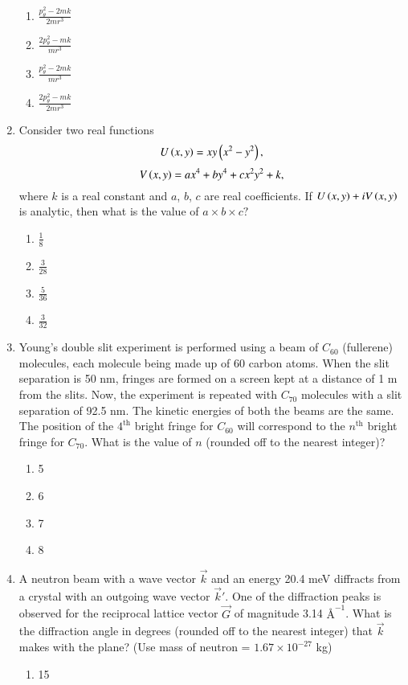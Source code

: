 \documentclass[journal]{IEEEtran}
\begin{document}
\begin{enumerate}
\begin{enumerate}
\item $\frac{p_{\theta}^2 - 2mk}{2mr^3}$
\item $\frac{2p_{\theta}^2 - mk}{mr^3}$
\item $\frac{p_{\theta}^2 - 2mk}{mr^3}$
\item $\frac{2p_{\theta}^2 - mk}{2mr^3}$
\end{enumerate}
\item Consider two real functions 
\[
U\left(x, y\right) = x y \left(x^2 - y^2\right),
\]
\[
V\left(x, y\right) = a x^4 + b y^4 + c x^2 y^2 + k,
\]
where $k$ is a real constant and $a$, $b$, $c$ are real coefficients. If $U\left(x, y\right) + i V\left(x, y\right)$ is analytic, then what is the value of $a \times b \times c?$
\begin{enumerate}
\item $\frac{1}{8}$
\item $\frac{3}{28}$
\item $\frac{5}{36}$
\item $\frac{3}{32}$
\end{enumerate}
\item Young’s double slit experiment is performed using a beam of $C_{60}$ (fullerene) molecules, each molecule being made up of 60 carbon atoms. When the slit separation is 50 nm, fringes are formed on a screen kept at a distance of 1 m from the slits. Now, the experiment is repeated with $C_{70}$ molecules with a slit separation of 92.5 nm. The kinetic energies of both the beams are the same. The position of the $4^{\text{th}}$ bright fringe for $C_{60}$ will correspond to the $n^{\text{th}}$ bright fringe for $C_{70}$. What is the value of $n$ (rounded off to the nearest integer)?
\begin{enumerate}
\item 5
\item 6
\item 7
\item 8
\end{enumerate}
\item A neutron beam with a wave vector $\vec{k}$ and an energy 20.4 meV diffracts from a crystal with an outgoing wave vector $\vec{k}'$. One of the diffraction peaks is observed for the reciprocal lattice vector $\vec{G}$ of magnitude 3.14 $Å^{-1}$. What is the diffraction angle in degrees (rounded off to the nearest integer) that $\vec{k}$ makes with the plane? (Use mass of neutron = $1.67 \times 10^{-27}$ kg)\begin{enumerate}
\item 15 

\end{enumerate}
\end{enumerate}
\end{document}

